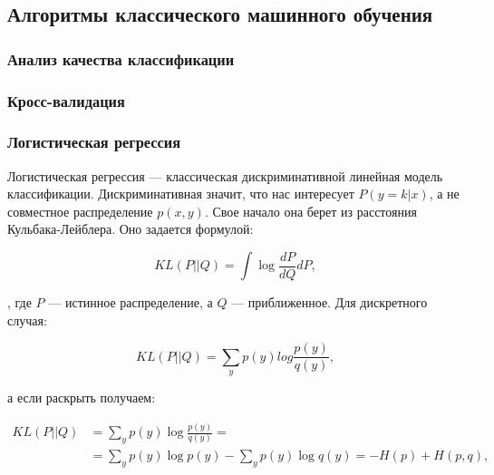 \subsection{Алгоритмы классического машинного обучения}


\subsubsection{Анализ качества классификации}












\subsubsection{Кросс-валидация}




















\subsubsection{Логистическая регрессия}
\label{subsection:logreg}

Логистическая регрессия --- классическая дискриминативной линейная модель классификации. Дискриминативная
значит, что нас интересует $P (y = k | x)$, а не совместное распределение $p (x, y)$. Свое начало она берет из
расстояния Кульбака-Лейблера. Оно задается формулой:

\begin{equation}
 KL(P||Q) = \int\log\frac{dP}{dQ}dP,
\end{equation}

, где $P$ --- истинное распределение, а $Q$ --- приближенное. Для дискретного случая:

\begin{equation}
 KL(P||Q) = \sum_{y} p(y)log\frac{p(y)}{q(y)},
\end{equation}

а если раскрыть получаем:

\begin{equation}
\begin{aligned}
 KL(P||Q) & = \sum_y p(y)\log\frac{p(y)}{q(y)} = \\
 & = \sum_y p(y) \log p(y) - \sum_y p(y) \log q(y) = - H(p) + H(p,q),
\end{aligned}
\end{equation}


